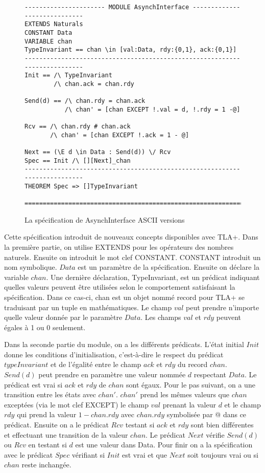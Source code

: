 \documentclass[12pt,a4paper]{article}
\begin{document}
\begin{figure}[ht]
\begin{lstlisting}[frame=single, basicstyle=\footnotesize]
---------------------- MODULE AsynchInterface -----------------------------
EXTENDS Naturals
CONSTANT Data
VARIABLE chan
TypeInvariant == chan \in [val:Data, rdy:{0,1}, ack:{0,1}]
---------------------------------------------------------------------------
Init == /\ TypeInvariant
        /\ chan.ack = chan.rdy
        
Send(d) == /\ chan.rdy = chan.ack
           /\ chan' = [chan EXCEPT !.val = d, !.rdy = 1 -@]
           
Rcv == /\ chan.rdy # chan.ack
       /\ chan' = [chan EXCEPT !.ack = 1 - @]

Next == (\E d \in Data : Send(d)) \/ Rcv
Spec == Init /\ [][Next]_chan
---------------------------------------------------------------------------
THEOREM Spec => []TypeInvariant       

===========================================================================
\end{lstlisting}
\caption{La spécification de AsynchInterface ASCII versions}
\end{figure}

Cette spécification introduit de nouveaux concepts disponibles avec TLA+. Dans la première partie, on utilise EXTENDS pour les opérateurs des nombres naturels. Ensuite on introduit le mot clef CONSTANT. CONSTANT introduit un nom symbolique. $Data$ est un paramètre de la spécification.
Ensuite on déclare la variable $chan$. Une dernière déclaration, TypeInvariant, est un prédicat indiquant quelles valeurs peuvent être utilisées selon le comportement satisfaisant la spécification. Dans ce cas-ci, chan est un objet nommé record pour TLA+ se traduisant par un tuple en mathématiques. Le champ $val$ peut prendre n'importe quelle valeur donnée par le paramètre $Data$. Les champs $val$ et $rdy$ peuvent égales à 1 ou 0 seulement.

Dans la seconde partie du module, on a les différents prédicats. L'état initial $Init$ donne les conditions d'initialisation, c'est-à-dire le respect du prédicat $typeInvariant$ et de l'égalité entre le champ $ack$ et $rdy$ du record $chan$. $Send(d)$ peut prendre en paramètre une valeur nommée $d$ respectant $Data$. Le prédicat est vrai si $ack$ et $rdy$ de $chan$ sont égaux. Pour le pas suivant, on a une transition entre les états avec $chan'$. $chan'$ prend les mêmes valeurs que $chan$ exceptées (via le mot clef EXCEPT) le champ $val$ prenant la valeur $d$ et le champ $rdy$ qui prend la valeur $1 - chan.rdy$ avec $chan.rdy$ symbolisée par @ dans ce prédicat.
Ensuite on a le prédicat $Rcv$ testant si $ack$ et $rdy$ sont bien différentes et effectuant une transition de la valeur $chan$.
Le prédicat $Next$ vérifie $Send(d)$ ou $Rcv$ en testant si $d$ est une valeur dans Data. Pour finir on a la spécification avec le prédicat $Spec$ vérifiant si $Init$ est vrai et que $Next$ soit toujours vrai ou si $chan$ reste inchangée.
\end{document}
